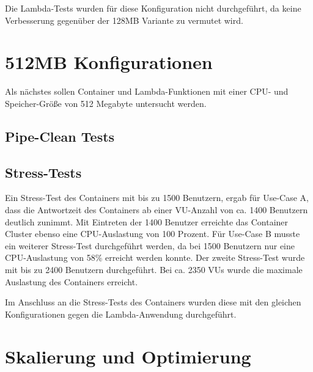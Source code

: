 Die Lambda-Tests wurden für diese Konfiguration nicht durchgeführt, da keine Verbesserung gegenüber der 128MB Variante zu vermutet wird.

\section{512MB Konfigurationen}
Als nächstes sollen Container und Lambda-Funktionen mit einer CPU- und Speicher-Größe von 512 Megabyte untersucht werden. 

\subsection{Pipe-Clean Tests}

\subsection{Stress-Tests}
Ein Stress-Test des Containers mit bis zu 1500 Benutzern, ergab für Use-Case A, dass die Antwortzeit des Containers ab einer VU-Anzahl von ca. 1400 Benutzern deutlich zunimmt. Mit Eintreten der 1400 Benutzer erreichte das Container Cluster ebenso eine CPU-Auslastung von 100 Prozent. Für Use-Case B musste ein weiterer Stress-Test durchgeführt werden, da bei 1500 Benutzern nur eine CPU-Auslastung von 58\% erreicht werden konnte. Der zweite Stress-Test wurde mit bis zu 2400 Benutzern durchgeführt. Bei ca. 2350 VUs wurde die maximale Auslastung des Containers erreicht.

Im Anschluss an die Stress-Tests des Containers wurden diese mit den gleichen Konfigurationen gegen die Lambda-Anwendung durchgeführt. 



\section{Skalierung und Optimierung}
